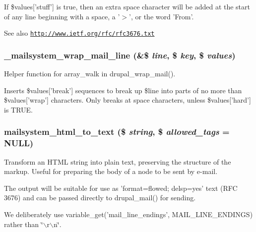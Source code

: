 If \$values\mbox{[}'stuff'\mbox{]} is true, then an extra space character will be added at the start of any line beginning with a space, a '$>$', or the word 'From'.

\begin{DoxySeeAlso}{See also}
\href{http://www.ietf.org/rfc/rfc3676.txt}{\tt http://www.ietf.org/rfc/rfc3676.txt} 
\end{DoxySeeAlso}
\hypertarget{html__to__text_8inc_af062b4bc2cb10c61afac44647167bd19}{
\subsubsection[{\_\-mailsystem\_\-wrap\_\-mail\_\-line}]{\setlength{\rightskip}{0pt plus 5cm}\_\-mailsystem\_\-wrap\_\-mail\_\-line (\&\$ {\em line}, \/  \$ {\em key}, \/  \$ {\em values})}}
\label{html__to__text_8inc_af062b4bc2cb10c61afac44647167bd19}
Helper function for array\_\-walk in drupal\_\-wrap\_\-mail().

Inserts \$values\mbox{[}'break'\mbox{]} sequences to break up \$line into parts of no more than \$values\mbox{[}'wrap'\mbox{]} characters. Only breaks at space characters, unless \$values\mbox{[}'hard'\mbox{]} is TRUE. \hypertarget{html__to__text_8inc_abd38fa306fb704f7e880c034042768b2}{
\subsubsection[{mailsystem\_\-html\_\-to\_\-text}]{\setlength{\rightskip}{0pt plus 5cm}mailsystem\_\-html\_\-to\_\-text (\$ {\em string}, \/  \$ {\em allowed\_\-tags} = {\ttfamily NULL})}}
\label{html__to__text_8inc_abd38fa306fb704f7e880c034042768b2}
Transform an HTML string into plain text, preserving the structure of the markup. Useful for preparing the body of a node to be sent by e-\/mail.

The output will be suitable for use as 'format=flowed; delsp=yes' text (RFC 3676) and can be passed directly to drupal\_\-mail() for sending.

We deliberately use variable\_\-get('mail\_\-line\_\-endings', MAIL\_\-LINE\_\-ENDINGS) rather than \char`\"{}$\backslash$r$\backslash$n\char`\"{}.

